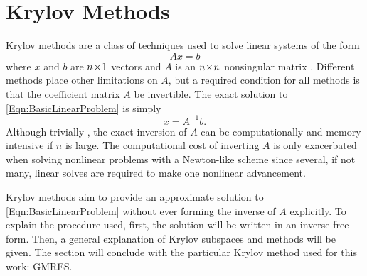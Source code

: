 \documentclass[12pt]{UWMadThesis}
\begin{document}
\section{Krylov Methods}
Krylov methods are a class of techniques used to solve linear systems of the form
\begin{equation}
    A x = b
    \label{Eqn:BasicLinearProblem}
\end{equation}
where $x$ and $b$ are $n \!\times\! 1$ vectors and $A$ is an $n \!\times\! n$ nonsingular matrix \cite{saad_iterative_2003}.
Different methods place other limitations on $A$, but a required condition for all methods is that the coefficient matrix $A$ be invertible.
The exact solution to \cref{Eqn:BasicLinearProblem} is simply
\begin{equation}
    x = A^{-1} b.
    \label{Eqn:BasicLinearSolution}
\end{equation}
Although trivially , the exact inversion of $A$ can be computationally and memory intensive if $n$ is large.
The computational cost of inverting $A$ is only exacerbated when solving nonlinear problems with a Newton-like scheme since several, if not many, linear solves are required to make one nonlinear advancement.

Krylov methods aim to provide an approximate solution to \cref{Eqn:BasicLinearProblem} without ever forming the inverse of $A$ explicitly.
To explain the procedure used, first, the solution will be written in an inverse-free form.
Then, a general explanation of Krylov subspaces and methods will be given.
The section will conclude with the particular Krylov method used for this work: GMRES.
\end{document}
